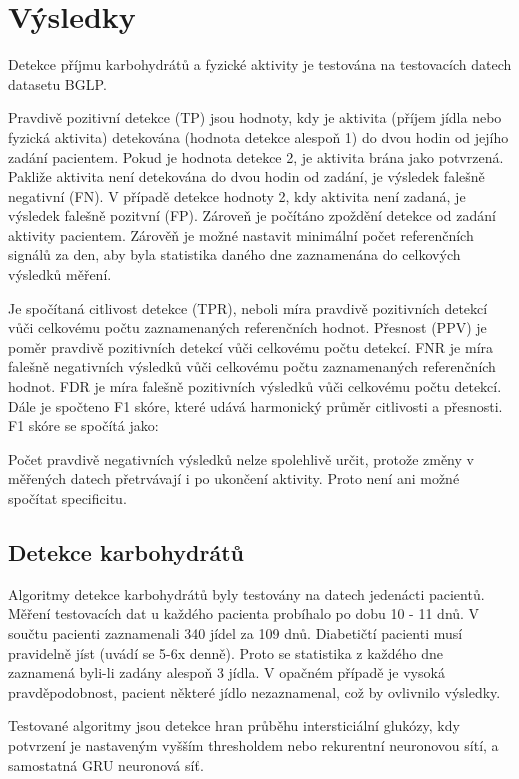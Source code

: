 \chapter{Výsledky}

Detekce příjmu karbohydrátů a fyzické aktivity je testována na testovacích datech datasetu BGLP.

Pravdivě pozitivní detekce (TP) jsou hodnoty, kdy je aktivita (příjem jídla nebo fyzická aktivita) detekována (hodnota detekce alespoň 1) do dvou hodin od jejího zadání pacientem. Pokud je hodnota detekce 2, je aktivita brána jako potvrzená. Pakliže aktivita není detekována do dvou hodin od zadání, je výsledek falešně negativní (FN). V případě detekce hodnoty 2, kdy aktivita není zadaná, je výsledek falešně pozitvní (FP). Zároveň je počítáno zpoždění detekce od zadání aktivity pacientem. Zárověň je možné nastavit minimální počet referenčních signálů za den, aby byla statistika daného dne zaznamenána do celkových výsledků měření.

Je spočítaná citlivost detekce (TPR), neboli míra pravdivě pozitivních detekcí vůči celkovému počtu zaznamenaných referenčních hodnot. Přesnost (PPV) je poměr pravdivě pozitivních detekcí vůči celkovému počtu detekcí. FNR je míra falešně negativních výsledků vůči celkovému počtu zaznamenaných referenčních hodnot. FDR je míra falešně pozitivních výsledků vůči celkovému počtu detekcí. Dále je spočteno F1 skóre, které udává harmonický průměr citlivosti a přesnosti. F1 skóre se spočítá jako:


Počet pravdivě negativních výsledků nelze spolehlivě určit, protože změny v měřených datech přetrvávají i po ukončení aktivity. Proto není ani možné spočítat specificitu.


\section{Detekce karbohydrátů}

Algoritmy detekce karbohydrátů byly testovány na datech jedenácti pacientů. Měření testovacích dat u každého pacienta probíhalo po dobu 10 - 11 dnů. V součtu pacienti zaznamenali 340 jídel za 109 dnů. Diabetičtí pacienti musí pravidelně jíst (uvádí se 5-6x denně). Proto se statistika z každého dne zaznamená byli-li zadány alespoň 3 jídla. V opačném případě je vysoká pravděpodobnost, pacient některé jídlo nezaznamenal, což by ovlivnilo výsledky.

Testované algoritmy jsou detekce hran průběhu intersticiální glukózy, kdy potvrzení je nastaveným vyšším thresholdem nebo rekurentní neuronovou sítí, a samostatná GRU neuronová síť.

